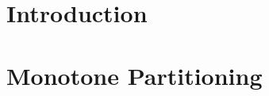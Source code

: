 



\section{Introduction}
\label{sec:partition_2_intro}


\section{Monotone Partitioning}
\label{sec:partition_2_monotone}


